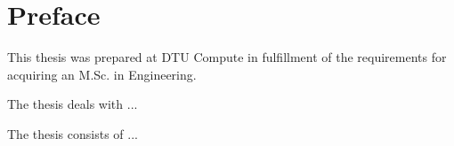 \chapter{Preface}

This thesis was prepared at DTU Compute in fulfillment of the requirements for acquiring an M.Sc. in Engineering.

The thesis deals with ...

The thesis consists of ...